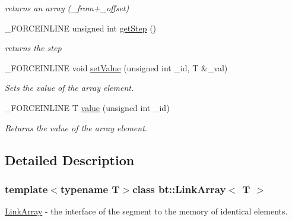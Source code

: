 \begin{DoxyCompactItemize}
\begin{DoxyCompactList}\small\item\em returns an array (\-\_\-from+\-\_\-offset) \end{DoxyCompactList}\item 
\hypertarget{classbt_1_1_link_array_a551783a0731ed197dd84e836a5b70934}{\-\_\-\-F\-O\-R\-C\-E\-I\-N\-L\-I\-N\-E unsigned int \hyperlink{classbt_1_1_link_array_a551783a0731ed197dd84e836a5b70934}{get\-Step} ()}\label{classbt_1_1_link_array_a551783a0731ed197dd84e836a5b70934}

\begin{DoxyCompactList}\small\item\em returns the step \end{DoxyCompactList}\item 
\hypertarget{classbt_1_1_link_array_af8eccebe87e7f4e0c0fb3e49c3db5648}{\-\_\-\-F\-O\-R\-C\-E\-I\-N\-L\-I\-N\-E void \hyperlink{classbt_1_1_link_array_af8eccebe87e7f4e0c0fb3e49c3db5648}{set\-Value} (unsigned int \-\_\-id, T \&\-\_\-val)}\label{classbt_1_1_link_array_af8eccebe87e7f4e0c0fb3e49c3db5648}

\begin{DoxyCompactList}\small\item\em Sets the value of the array element. \end{DoxyCompactList}\item 
\hypertarget{classbt_1_1_link_array_a9b0f2ad474e6bc679b1c44b83c884f69}{\-\_\-\-F\-O\-R\-C\-E\-I\-N\-L\-I\-N\-E T \hyperlink{classbt_1_1_link_array_a9b0f2ad474e6bc679b1c44b83c884f69}{value} (unsigned int \-\_\-id)}\label{classbt_1_1_link_array_a9b0f2ad474e6bc679b1c44b83c884f69}

\begin{DoxyCompactList}\small\item\em Returns the value of the array element. \end{DoxyCompactList}\end{DoxyCompactItemize}


\subsection{Detailed Description}
\subsubsection*{template$<$typename T$>$class bt\-::\-Link\-Array$<$ T $>$}

\hyperlink{classbt_1_1_link_array}{Link\-Array} -\/ the interface of the segment to the memory of identical elements. 

